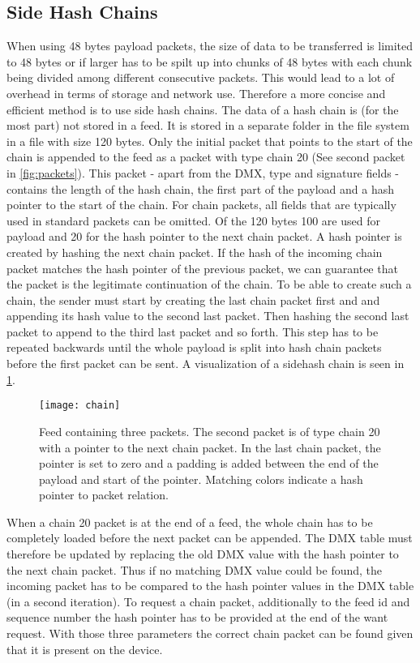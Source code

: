 \subsection{Side Hash Chains}
When using 48 bytes payload packets, the size of data to be transferred is limited to 48 bytes or if larger has to be spilt up into chunks of 48 bytes with each chunk being divided among different consecutive packets. This would lead to a lot of overhead in terms of storage and network use. Therefore a more concise and efficient method is to use side hash chains. The data of a hash chain is (for the most part) not stored in a feed. It is stored in a separate folder in the file system in a file with size 120 bytes. Only the initial packet that points to the start of the chain is appended to the feed as a packet with type chain 20 (See second packet in \cref{fig:packets}). This packet - apart from the DMX, type and signature fields - contains the length of the hash chain, the first part of the payload and a hash pointer to the start of the chain. For chain packets, all fields that are typically used in standard packets can be omitted. Of the 120 bytes 100 are used for payload and 20 for the hash pointer to the next chain packet. A hash pointer is created by hashing the next chain packet. If the hash of the incoming chain packet matches the hash pointer of the previous packet, we can guarantee that the packet is the legitimate continuation of the chain. To be able to create such a chain, the sender must start by creating the last chain packet first and and appending its hash value to the second last packet. Then hashing the second last packet to append to the third last packet and so forth. This step has to be repeated backwards until the whole payload is split into hash chain packets before the first packet can be sent. A visualization of a sidehash chain is seen in \cref{fig:chain}. \\
\begin{figure}
\centering
\texttt{[image: chain]}
\caption{Feed containing three packets. The second packet is of type chain 20 with a pointer to the next chain packet. In the last chain packet, the pointer is set to zero and a padding is added between the end of the payload and start of the pointer. Matching colors indicate a hash pointer to packet relation.}
\label{fig:chain}
\end{figure}

When a chain 20 packet is at the end of a feed, the whole chain has to be completely loaded before the next packet can be appended. The DMX table must therefore be updated by replacing the old DMX value with the hash pointer to the next chain packet. Thus if no matching DMX value could be found, the incoming packet has to be compared to the hash pointer values in the DMX table (in a second iteration). To request a chain packet, additionally to the feed id and sequence number the hash pointer has to be provided at the end of the want request. With those three parameters the correct chain packet can be found given that it is present on the device. \\


